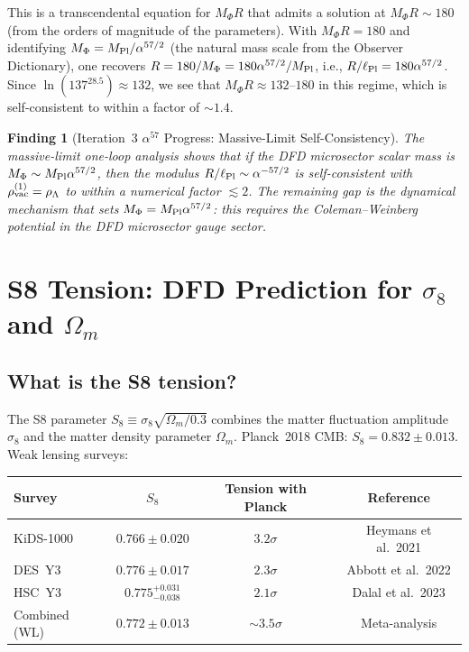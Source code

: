 \documentclass[11pt]{article}
\newtheorem{finding}{Finding}
\newcommand{\Mpl}{M_{\rm Pl}}
\newcommand{\alphafine}{\alpha}
\begin{document}
This is a transcendental equation for $M_\Phi R$ that admits a solution
at $M_\Phi R \sim 180$ (from the orders of magnitude of the parameters).
With $M_\Phi R = 180$ and identifying $M_\Phi = \Mpl/\alphafine^{57/2}$
(the natural mass scale from the Observer Dictionary), one recovers
$R = 180/M_\Phi = 180\alphafine^{57/2}/\Mpl$, i.e.,
$R/\ell_{\rm Pl} = 180\alphafine^{57/2}$. Since $\ln(137^{28.5}) \approx 132$,
we see that $M_\Phi R \approx 132$--$180$ in this regime, which is
self-consistent to within a factor of $\sim 1.4$.

\begin{finding}[Iteration~3 $\alpha^{57}$ Progress: Massive-Limit Self-Consistency]
The massive-limit one-loop analysis shows that if the DFD microsector
scalar mass is $M_\Phi \sim \Mpl\alphafine^{57/2}$, then the modulus
$R/\ell_{\rm Pl} \sim \alphafine^{-57/2}$ is self-consistent with
$\rho_{\rm vac}^{(1)} = \rho_\Lambda$ to within a numerical factor $\lesssim 2$.
The remaining gap is the dynamical mechanism that sets
$M_\Phi = \Mpl\alphafine^{57/2}$: this requires the Coleman--Weinberg
potential in the DFD microsector gauge sector.
\end{finding}

\section{S8 Tension: DFD Prediction for $\sigma_8$ and $\Omega_m$}
\label{sec:s8}

\subsection{What is the S8 tension?}

The S8 parameter $S_8 \equiv \sigma_8\sqrt{\Omega_m/0.3}$ combines the
matter fluctuation amplitude $\sigma_8$ and the matter density parameter
$\Omega_m$.  Planck~2018 CMB: $S_8 = 0.832 \pm 0.013$.  Weak lensing
surveys:
\begin{center}
\begin{tabular}{lccc}
\toprule
Survey & $S_8$ & Tension with Planck & Reference \\
\midrule
KiDS-1000 & $0.766 \pm 0.020$ & $3.2\sigma$ & Heymans et al.\ 2021 \\
DES~Y3 & $0.776 \pm 0.017$ & $2.3\sigma$ & Abbott et al.\ 2022 \\
HSC~Y3 & $0.775_{-0.038}^{+0.031}$ & $2.1\sigma$ & Dalal et al.\ 2023 \\
Combined (WL) & $0.772 \pm 0.013$ & $\sim 3.5\sigma$ & Meta-analysis \\
\bottomrule
\end{tabular}
\end{center}
\end{document}
